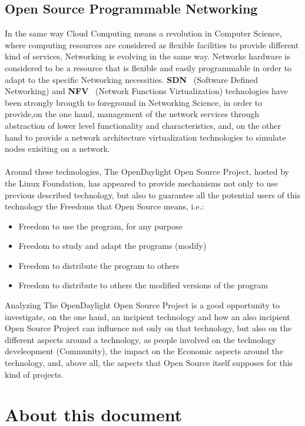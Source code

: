 \documentclass[a4paper, 12pt]{book}
\begin{document}
\subsection{Open Source Programmable Networking}
\label{subsec:freesoftware}
In the same way Cloud Computing means a revolution in Computer Science, where computing resources are considered as flexible facilities to provide different kind of services, Networking is evolving in the same way. Networks hardware is considered to be a resource that is flexible and easily programmable in order to adapt to the specific Networking necessities. \textbf{SDN}~\cite{OpenNetworkingSDNDefinition} (Software Defined Networking) and \textbf{NFV}~\cite{ETSINFVDefinition} (Network Functions Virtualization) technologies have been strongly brougth to foreground in Networking Science, in order to provide,on the one hand, management of the network services through abstraction of lower level functionality and characteristics, and, on the other hand to provide a network architecture virtualization technologies to simulate nodes exisiting on a network.\\
\\
Around these technologies, The OpenDaylight Open Source Project, hosted by the Linux Foundation, has appeared to provide mechanisms not only to use previous described technology, but also to guarantee all the potential users of this technology the Freedoms that Open Source means, i.e.:
\begin{itemize}
 \item Freedom to use the program, for any purpose
 \item Freedom to study and adapt the programs (modify)
 \item Freedom to distribute the program to others
 \item Freedom to distribute to others the modified versions of the program
\end{itemize}
Analyzing The OpenDaylight Open Source Project is a good opportunity to investigate, on the one hand, an incipient technology and how an also incipient Open Source Project can influence not only on that technology, but also on the different aspects around a technology, as people involved on the technology develeopment (Community), the impact on the Economic aspects around the technology, and, above all, the aspects that Open Source itself supposes for this kind of projects.

\section{About this document}
\label{sec:about}
\end{document}
